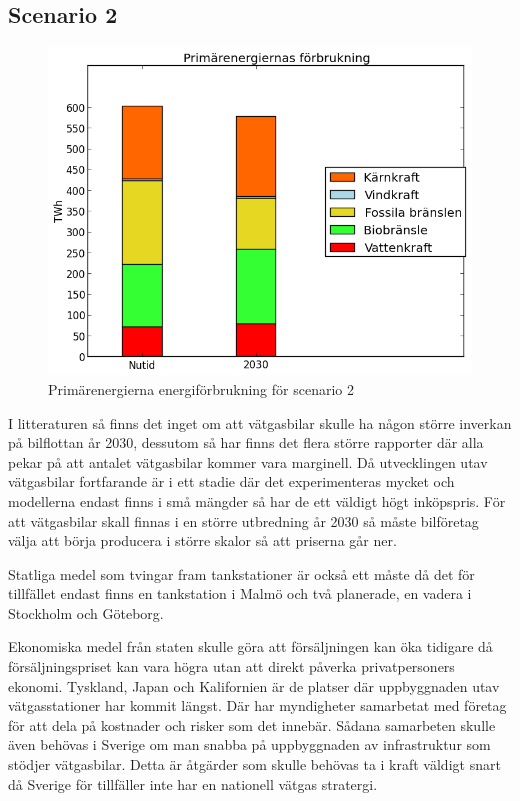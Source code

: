 \documentclass[a4paper,11pt,fleqn, titlepage]{article}
\begin{document}
\subsection{Scenario 2}
\begin{figure}[h!]
       \centering
       \includegraphics[scale=0.7]{scen2energidiagram.png}
       \caption{Primärenergierna energiförbrukning för scenario 2}
       \label{fig:scen2energydiagram}
\end{figure}
I litteraturen så finns det inget om att vätgasbilar skulle ha någon större inverkan på bilflottan år 2030, dessutom så har finns det flera större rapporter där alla pekar på att antalet vätgasbilar kommer vara marginell.
Då utvecklingen utav vätgasbilar fortfarande är i ett stadie där det experimenteras mycket och modellerna endast finns i små mängder så har de ett väldigt högt inköpspris. För att vätgasbilar skall finnas i en större utbredning år 2030 så måste bilföretag välja att börja producera i större skalor så att priserna går ner.

Statliga medel som tvingar fram tankstationer är också ett måste då det för tillfället endast finns en tankstation i Malmö och två planerade, en vadera i Stockholm och Göteborg.

Ekonomiska medel från staten skulle göra att försäljningen kan öka tidigare då försäljningspriset kan vara högra utan att direkt påverka privatpersoners ekonomi.
Tyskland, Japan och Kalifornien är de platser där uppbyggnaden utav vätgasstationer har kommit längst. Där har myndigheter samarbetat med företag för att dela på kostnader och risker som det innebär. Sådana samarbeten skulle även behövas i Sverige om man snabba på uppbyggnaden av infrastruktur som stödjer vätgasbilar.
Detta är åtgärder som skulle behövas ta i kraft väldigt snart då Sverige för tillfäller inte har en nationell vätgas stratergi.
\end{document}
